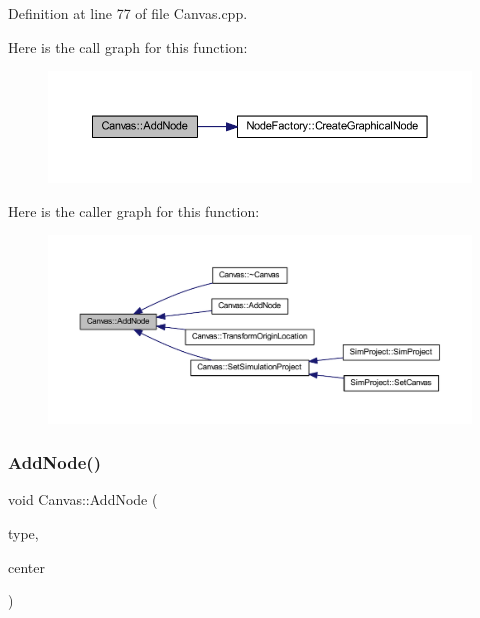 Definition at line 77 of file Canvas.\+cpp.

Here is the call graph for this function\+:
\nopagebreak
\begin{figure}[H]
\begin{center}
\leavevmode
\includegraphics[width=350pt]{class_canvas_aec9038762b17b62ff6126bd6277a9cd8_cgraph}
\end{center}
\end{figure}
Here is the caller graph for this function\+:
\nopagebreak
\begin{figure}[H]
\begin{center}
\leavevmode
\includegraphics[width=350pt]{class_canvas_aec9038762b17b62ff6126bd6277a9cd8_icgraph}
\end{center}
\end{figure}
\mbox{\label{class_canvas_aaec53b68c7b24704e399b565731ed545}} 
\subsubsection{\texorpdfstring{Add\+Node()}{AddNode()}\hspace{0.1cm}{\footnotesize\ttfamily [2/2]}}
{\footnotesize\ttfamily void Canvas\+::\+Add\+Node (\begin{DoxyParamCaption}\item[{\hyperlink{class_generic_node_a9e7985ab9bbfa1c85091adc0ab71a6b6}{Generic\+Node\+::\+Type}}]{type,  }\item[{wx\+Point2\+D\+Double}]{center }\end{DoxyParamCaption})}



